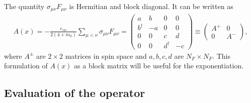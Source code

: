\documentclass[12pt]{article}
\begin{document}
The quantity $\sigma_{\mu\nu}F_{\mu\nu}$ is Hermitian and block diagonal. It can be written as
\begin{align}
A(x)=-\frac{c_{sw}}{2(4+m_0)} \sum_{\mu<\nu}\sigma_{\mu\nu}F_{\mu\nu} =
 \begin{pmatrix}
 a & b & 0 & 0 \\
 b^\dagger & -a & 0 & 0 \\
 0  & 0 & c & d \\
 0 & 0 & d^\dagger & -c
 \end{pmatrix} \equiv \begin{pmatrix}
 A^+ & 0 \\
 0 & A^-
 \end{pmatrix}, \label{eq:blocks}
\end{align}
where $A^\pm$ are $2 \times 2$ matrices in spin space and $a,b,c,d$ are $N_F \times N_F$. This formulation of $A(x)$ as a block matrix will be useful for the exponentiation.

\subsection*{Evaluation of the operator}
\end{document}
